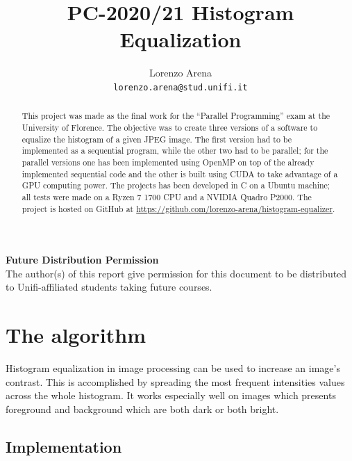 \documentclass[10pt,twocolumn,letterpaper]{article}
\begin{document}
\title{PC-2020/21 Histogram Equalization}

\author{Lorenzo Arena\\
{\tt\small lorenzo.arena@stud.unifi.it}
}

\maketitle
\thispagestyle{empty}

\begin{abstract}
    This project was made as the final work for the “Parallel Programming”
    exam at the University of Florence. The objective was to create three
    versions of a software to equalize the histogram of a given JPEG image.
    The first version had to be implemented as a sequential program, while
    the other two had to be parallel; for the parallel versions one has
    been implemented using OpenMP on top of the already implemented sequential
    code and the other is built using CUDA to take advantage of a GPU computing
    power. The projects has been developed in C on a Ubuntu machine; all
    tests were made on a Ryzen 7 1700 CPU and a NVIDIA Quadro P2000. The project
    is hosted on GitHub at \url{https://github.com/lorenzo-arena/histogram-equalizer}.
 \end{abstract}

\noindent\large\textbf{Future Distribution Permission}\\
\indent The author(s) of this report give permission for this document to be
        distributed to Unifi-affiliated students taking future courses.

\section{The algorithm}

Histogram equalization in image processing can be used to increase an image's
contrast. This is accomplished by spreading the most frequent intensities
values across the whole histogram. It works especially well on images which
presents foreground and background which are both dark or both bright.

\subsection{Implementation}
\end{document}
